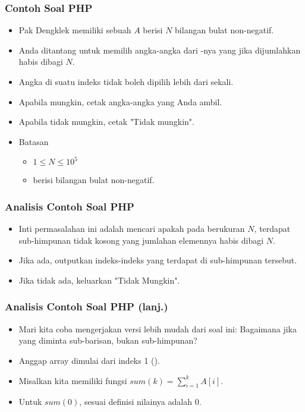 \begin{frame}
\frametitle{Contoh Soal PHP}
\begin{itemize}
  \item Pak Dengklek memiliki sebuah  $A$ berisi $N$ bilangan bulat non-negatif.
  \item Anda ditantang untuk memilih angka-angka dari -nya yang jika dijumlahkan habis dibagi $N$.
  \item Angka di suatu indeks  tidak boleh dipilih lebih dari sekali.
  \item Apabila mungkin, cetak angka-angka yang Anda ambil.
  \item Apabila tidak mungkin, cetak "Tidak mungkin".
  \item Batasan
  \begin{itemize}
    \item $1 \leq N \leq 10^{5}$
    \item {} berisi bilangan bulat non-negatif.
  \end{itemize}
\end{itemize}
\end{frame}

\begin{frame}
\frametitle{Analisis Contoh Soal PHP}
\begin{itemize}
  \item Inti permasalahan ini adalah mencari apakah pada  berukuran $N$, terdapat sub-himpunan tidak kosong yang jumlahan elemennya habis dibagi $N$.
  \item Jika ada, outputkan indeks-indeks yang terdapat di sub-himpunan tersebut.
  \item Jika tidak ada, keluarkan "Tidak Mungkin".
\end{itemize}
\end{frame}

\begin{frame}
\frametitle{Analisis Contoh Soal PHP (lanj.)}
\begin{itemize}
  \item Mari kita coba mengerjakan versi lebih mudah dari soal ini:
  Bagaimana jika yang diminta sub-barisan, bukan sub-himpunan?
  \item Anggap array dimulai dari indeks 1 ().
  \item Misalkan kita memiliki fungsi $sum(k) = \sum\limits_{i=1}^k A[i]$.
  \item Untuk $sum(0)$, sesuai definisi nilainya adalah $0$.
\end{itemize}
\end{frame}

